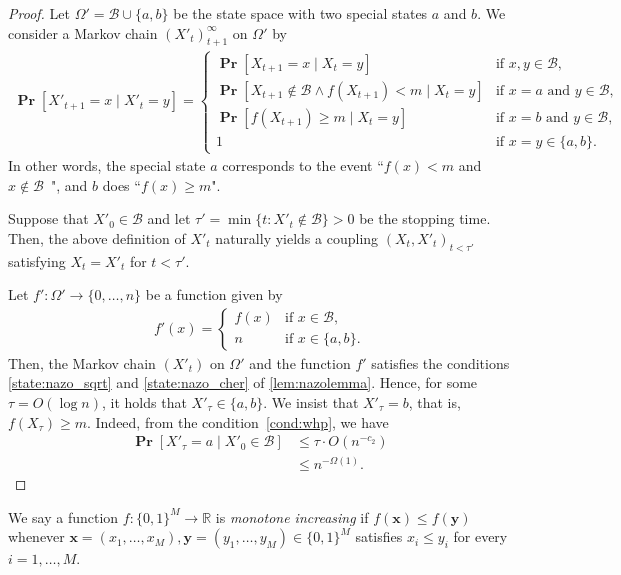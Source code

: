 \documentclass[letterpaper,11pt]{article}
\renewcommand\Pr{\mathop{\mathbf{Pr}}}
\begin{document}
\begin{proof}
Let $\Omega'=\mathcal{B}\cup \{a,b\}$ be the state space with two special states $a$ and $b$.
We consider a Markov chain $(X'_t)_{t+1}^\infty$ on $\Omega'$ by
\begin{align*}
\Pr[X'_{t+1}=x \mid X'_t=y] =\begin{cases}
\Pr[X_{t+1}=x \mid X_t=y] & \text{if $x,y\in \mathcal{B}$},\\
\Pr[X_{t+1}\not\in\mathcal{B}\land f(X_{t+1})< m \mid X_t=y] & \text{if $x=a$ and $y\in\mathcal{B}$}, \\
\Pr[f(X_{t+1})\geq m \mid X_t=y] &\text{if $x=b$ and $y\in\mathcal{B}$}, \\
1 & \text{if $x=y\in\{a,b\}$}.
\end{cases}
\end{align*}
In other words, the special state $a$ corresponds to the event ``$f(x)<m$ and $x\not\in\mathcal{B}$~", and $b$ does ``$f(x)\geq m$".

Suppose that $X'_0\in \mathcal{B}$ and let $\tau'=\min\{t:X'_t\not\in\mathcal{B}\}>0$ be the stopping time.
Then, the above definition of $X'_t$ naturally yields a coupling $(X_t,X'_t)_{t<\tau'}$ satisfying $X_t=X'_t$ for $t<\tau'$.

Let $f':\Omega'\to\{0,\ldots,n\}$ be a function given by
\begin{align*}
f'(x) = \begin{cases}
f(x) & \text{if $x\in\mathcal{B}$},\\
n & \text{if $x\in \{a,b\}$}.
\end{cases}
\end{align*}
Then, the Markov chain $(X'_t)$ on $\Omega'$ and the function $f'$ satisfies the conditions \ref{state:nazo_sqrt} and \ref{state:nazo_cher} of \cref{lem:nazolemma}.
Hence, for some $\tau=O(\log n)$, it holds that $X'_\tau \in \{a,b\}$.
We insist that $X'_\tau=b$, that is, $f(X_\tau)\geq m$.
Indeed, from the condition~\ref{cond:whp}, we have
\begin{align*}
\Pr[X'_\tau=a \mid X'_0\in\mathcal{B}]&\leq \tau\cdot O(n^{-c_2}) \\
&\leq n^{-\Omega(1)}.
\end{align*}
\end{proof}

We say a function $f:\{0,1\}^M\to\mathbb{R}$ is \emph{monotone increasing} if $f(\mathbf{x})\leq f(\mathbf{y})$ whenever $\mathbf{x}=(x_1,\ldots,x_M),\mathbf{y}=(y_1,\ldots,y_M)\in\{0,1\}^M$ satisfies $x_i\leq y_i$ for every $i=1,\ldots,M$.
\end{document}
